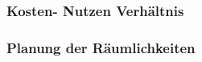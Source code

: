 \chapter{}
\label{sec:overview}

\subsection{Kosten- Nutzen Verhältnis}





\subsection{Planung der Räumlichkeiten}





